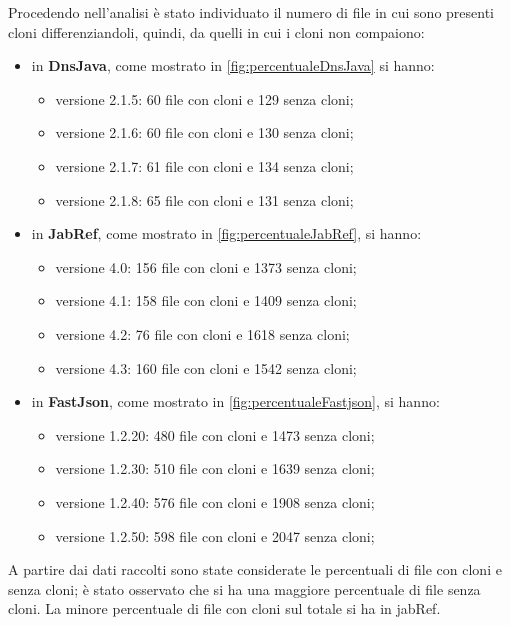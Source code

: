 Procedendo nell'analisi è stato individuato il numero di file in cui sono presenti cloni differenziandoli, quindi, da quelli in cui i cloni non compaiono:
\begin{itemize}
	\item in \textbf{DnsJava}, come mostrato in \autoref{fig:percentualeDnsJava} si hanno:
	\begin{itemize}
		\item versione 2.1.5: 60 file con cloni e 129 senza cloni;
		\item versione 2.1.6: 60 file con cloni e 130 senza cloni;
		\item versione 2.1.7: 61 file con cloni e 134 senza cloni;
		\item versione 2.1.8: 65 file con cloni e 131 senza cloni;
	\end{itemize}
	\item in \textbf{JabRef}, come mostrato in \autoref{fig:percentualeJabRef}, si hanno:
	\begin{itemize}
		\item versione 4.0: 156 file con cloni e 1373 senza cloni;
		\item versione 4.1: 158 file con cloni e 1409 senza cloni;
		\item versione 4.2: 76 file con cloni e 1618 senza cloni;
		\item versione 4.3: 160 file con cloni e 1542 senza cloni;
	\end{itemize}
		\item in \textbf{FastJson}, come mostrato in \autoref{fig:percentualeFastjson}, si hanno:
	\begin{itemize}
		\item versione 1.2.20: 480 file con cloni e 1473 senza cloni;
		\item versione 1.2.30: 510 file con cloni e 1639 senza cloni;
		\item versione 1.2.40: 576 file con cloni e 1908 senza cloni;
		\item versione 1.2.50: 598 file con cloni e 2047 senza cloni;
	\end{itemize}
\end{itemize}
A partire dai dati raccolti sono state considerate le percentuali di file con cloni e senza cloni; è stato osservato che si ha una maggiore percentuale di file senza cloni. La minore percentuale di file con cloni sul totale si ha in jabRef. \\
